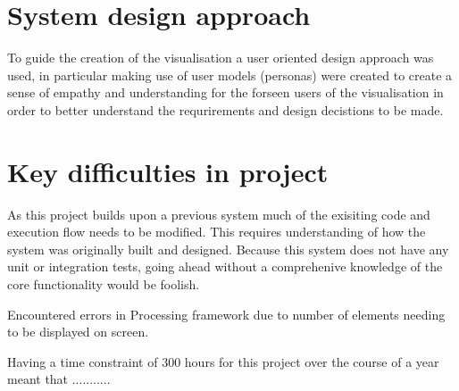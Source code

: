 \section{System design approach}
To guide the creation of the visualisation a user oriented design approach was used, in particular making use of user models (personas) were created to create a sense of empathy and understanding for the forseen users of the visualisation in order to better understand the requrirements and design decistions to be made. 

\section{Key difficulties in project}
As this project builds upon a previous system much of the exisiting code and execution flow needs to be modified. This requires understanding of how the system was originally built and designed. Because this system does not have any unit or integration tests, going ahead without a comprehenive knowledge of the core functionality would be foolish.

Encountered errors in Processing framework due to number of elements needing to be displayed on screen. 

Having a time constraint of 300 hours for this project over the course of a year meant that ...........

